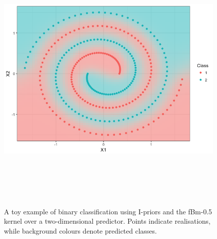 \documentclass{beamer}
\newlength{\onecolwid}
\newlength{\twocolwid}
\begin{document}
\begin{frame}[t]
\begin{columns}[t]
\begin{column}{\twocolwid}
\begin{columns}[t,totalwidth=\twocolwid]
\begin{column}{\onecolwid}
\vspace{-1.5cm}
\begin{figure}[t]
  \includegraphics[width=\linewidth,height=13.5cm]{figure/binary_probit}
  \caption{A toy example of binary classification using I-priors and the fBm-0.5 kernel over a two-dimensional predictor. Points indicate realisations, while background colours denote predicted classes.}
\end{figure}

\end{column} %

\end{columns} %


%
%
%


\end{column}
\end{columns}
\end{frame}
\end{document}
